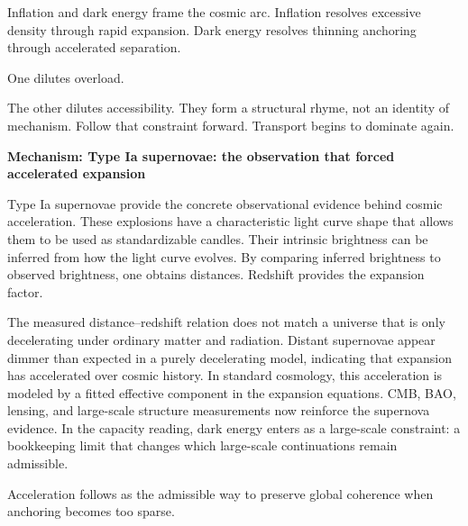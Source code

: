 \documentclass[11pt,twoside,openright]{book}
\newenvironment{mechanismbox}[1]
  {\begin{framed}\noindent\textbf{Mechanism: #1}\par\medskip}
  {\end{framed}}
\begin{document}
Inflation and dark energy frame the cosmic arc. Inflation resolves excessive density through rapid expansion. Dark energy resolves thinning anchoring through accelerated separation.

One dilutes overload.

The other dilutes accessibility. They form a structural rhyme, not an identity of mechanism. Follow that constraint forward. Transport begins to dominate again.

\begin{mechanismbox}{Type Ia supernovae: the observation that forced accelerated expansion}

Type Ia supernovae provide the concrete observational evidence behind cosmic acceleration. These explosions have a characteristic light curve shape that allows them to be used as standardizable candles. Their intrinsic brightness can be inferred from how the light curve evolves. By comparing inferred brightness to observed brightness, one obtains distances. Redshift provides the expansion factor.

The measured distance--redshift relation does not match a universe that is only decelerating under ordinary matter and radiation. Distant supernovae appear dimmer than expected in a purely decelerating model, indicating that expansion has accelerated over cosmic history. In standard cosmology, this acceleration is modeled by a fitted effective component in the expansion equations. CMB, BAO, lensing, and large-scale structure measurements now reinforce the supernova evidence. In the capacity reading, dark energy enters as a large-scale constraint: a bookkeeping limit that changes which large-scale continuations remain admissible.

Acceleration follows as the admissible way to preserve global coherence when anchoring becomes too sparse.

\end{mechanismbox}
\end{document}
